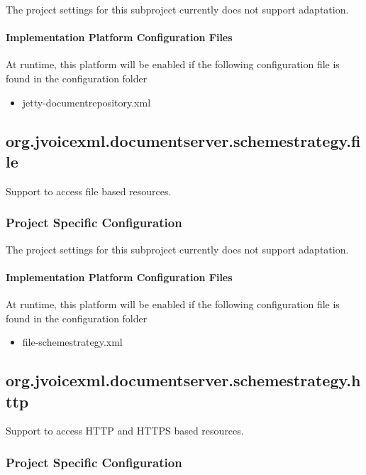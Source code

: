 \documentclass[11pt,a4paper]{article}
\begin{document}
The project settings for this subproject currently does not support adaptation.

\paragraph{Implementation Platform Configuration Files}

At runtime, this platform will be enabled if the following configuration file is found in the configuration
folder
\begin{itemize}
\item jetty-documentrepository.xml
\end{itemize}

\subsection{org.jvoicexml.documentserver.schemestrategy.file}

Support to access file based resources.

\subsubsection{Project Specific Configuration}

The project settings for this subproject currently does not support adaptation.

\paragraph{Implementation Platform Configuration Files}

At runtime, this platform will be enabled if the following configuration file is found in the configuration
folder
\begin{itemize}
\item file-schemestrategy.xml
\end{itemize}

\subsection{org.jvoicexml.documentserver.schemestrategy.http}

Support to access HTTP and HTTPS based resources.

\subsubsection{Project Specific Configuration}
\end{document}
